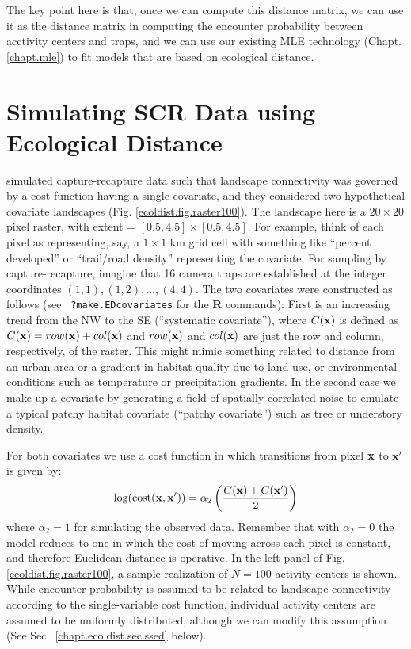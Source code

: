 The key point here is that, once we can compute this distance matrix,
we can use it as the distance matrix in computing the encounter
probability between acctivity centers and traps, and we can use our
existing MLE technology (Chapt. \ref{chapt.mle}) to fit models that
are based on ecological distance.



\section{Simulating SCR Data using Ecological Distance}
\label{ecoldist.sec.simulating}

\citet{royle_etal:2012ecol} simulated capture-recapture data
such that landscape connectivity was governed by %
a cost function having a
single covariate, and they considered two hypothetical covariate
landscapes
(Fig. \ref{ecoldist.fig.raster100}).
The landscape here is a $20 \times 20$ pixel raster, with
extent = $[0.5, 4.5] \times [0.5, 4.5]$.
For example, think of each pixel as
representing, say, a $1 \times 1$ km grid cell with something like
``percent developed'' or ``trail/road density'' representing the
covariate. For sampling by capture-recapture, imagine
that 16 camera traps are established at the integer coordinates
$(1,1), (1,2), \ldots, (4,4)$.
The two covariates were constructed as follows (see \mbox{\tt
  ?make.EDcovariates} for the {\bf R} commands):
First is an increasing trend from
the NW to the SE (``systematic covariate''), where $C({\bf x})$ is defined as
$C({\bf x}) = row({\bf x}) + col({\bf x})$ and $row({\bf x})$ and $col({\bf x})$ are just the row and
column, respectively, of the raster.  This might mimic something
related to distance from an urban area or a gradient in habitat
quality due to land use, or environmental conditions such as
temperature or precipitation gradients.  In the second case we make up
a covariate by generating a field of spatially correlated noise to
emulate a typical patchy habitat covariate (``patchy covariate'') such as
tree or understory density.

For both covariates we use a
cost function in which transitions from pixel ${\bf x}$ to ${\bf x}'$
is given by:
\[
 \log(\mbox{cost}({\bf x},{\bf x}'))=  \alpha_2 \left( \frac{C({\bf
       x}) + C({\bf x}')}{2} \right)
\]
where $\alpha_2 = 1$ for simulating the observed data.
 Remember that with $\alpha_2=0$ the
model reduces to one in which the cost of moving across each pixel is
constant, and therefore Euclidean distance is operative.
In the left panel of
Fig. \ref{ecoldist.fig.raster100}, a sample realization of
$N=100$ activity centers is shown. While encounter probability is
assumed to be related to landscape connectivity according to the
single-variable cost function, individual activity centers are
assumed to be uniformly distributed, although we can modify this
assumption (See Sec.~\ref{chapt.ecoldist.sec.ssed} below).


